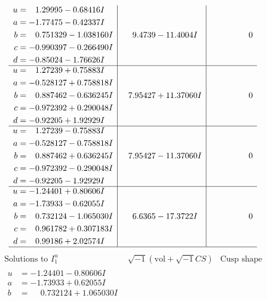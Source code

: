 \documentclass[1p]{elsarticle_modified}
\theoremstyle{definition}
\newcommand{\I}{\sqrt{-1}}
\begin{document}
$$\begin{array}{c|c|c}
\begin{aligned}
u &= \phantom{-}1.29995 - 0.68416 I \\
a &= -1.77475 - 0.42337 I \\
b &= \phantom{-}0.751329 - 1.038160 I \\
c &= -0.990397 - 0.266490 I \\
d &= -0.85024 - 1.76626 I\end{aligned}
 & \phantom{-}9.4739 - 11.4004 I & \phantom{-0.000000 } 0 \\ \hline\begin{aligned}
u &= \phantom{-}1.27239 + 0.75883 I \\
a &= -0.528127 + 0.758818 I \\
b &= \phantom{-}0.887462 - 0.636245 I \\
c &= -0.972392 + 0.290048 I \\
d &= -0.92205 + 1.92929 I\end{aligned}
 & \phantom{-}7.95427 + 11.37060 I & \phantom{-0.000000 } 0 \\ \hline\begin{aligned}
u &= \phantom{-}1.27239 - 0.75883 I \\
a &= -0.528127 - 0.758818 I \\
b &= \phantom{-}0.887462 + 0.636245 I \\
c &= -0.972392 - 0.290048 I \\
d &= -0.92205 - 1.92929 I\end{aligned}
 & \phantom{-}7.95427 - 11.37060 I & \phantom{-0.000000 } 0 \\ \hline\begin{aligned}
u &= -1.24401 + 0.80606 I \\
a &= -1.73933 - 0.62055 I \\
b &= \phantom{-}0.732124 - 1.065030 I \\
c &= \phantom{-}0.961782 + 0.307183 I \\
d &= \phantom{-}0.99186 + 2.02574 I\end{aligned}
 & \phantom{-}6.6365 - 17.3722 I & \phantom{-0.000000 } 0\\
 \hline 
 \end{array}$$\newpage$$\begin{array}{c|c|c}  
\text{Solutions to }I^u_{1}& \I (\text{vol} + \sqrt{-1}CS) & \text{Cusp shape}\\
 \hline 
\begin{aligned}
u &= -1.24401 - 0.80606 I \\
a &= -1.73933 + 0.62055 I \\
b &= \phantom{-}0.732124 + 1.065030 I \\

\end{aligned}
\end{array}$$
\end{document}
